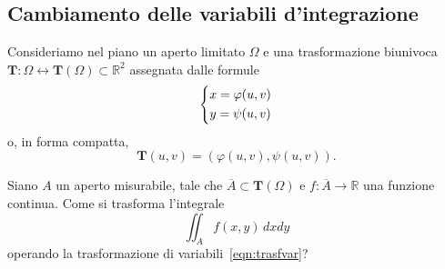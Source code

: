 \documentclass[a4paper]{book}
\numberwithin{equation}{section}
\renewcommand{\phi}{\varphi}
\theoremstyle{plain}
\theoremstyle{definition}
\theoremstyle{remark}
\theoremstyle{example}
\begin{document}
\subsection{Cambiamento delle variabili d'integrazione}
Consideriamo nel piano un aperto limitato $\Omega$ e una trasformazione biunivoca $\mathbf{T} \colon \Omega \leftrightarrow \mathbf{T}(\Omega) \subset \mathbb{R}^2$ assegnata dalle formule
	\begin{equation}
	\label{eqn:trasfvar}
		\begin{dcases}
		x = \phi(u, v) \\
		y = \psi(u, v)
		\end{dcases}
	\end{equation}
o, in forma compatta,
	\begin{equation*}
	\mathbf{T}(u, v) = (\phi(u, v), \psi(u, v)).
	\end{equation*}

Siano $A$ un aperto misurabile, tale che $\overline{A} \subset \mathbf{T}(\Omega)$ e $f\colon \overline{A} \to \mathbb{R}$ una funzione continua. Come si trasforma l'integrale
	\begin{equation}
	\iint_A f(x, y) \,dxdy
	\end{equation}
operando la trasformazione di variabili~\eqref{eqn:trasfvar}?
\end{document}
